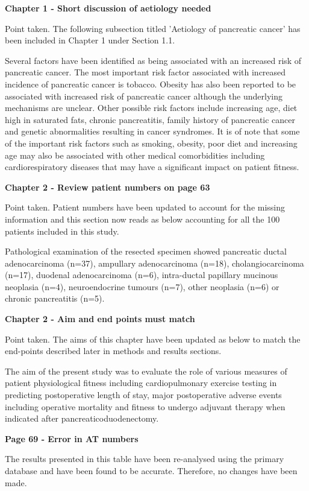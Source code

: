 \documentclass[12pt,a4paper]{article}
\begin{document}
	
\textbf{Chapter 1 - Short discussion of aetiology needed}
	
	Point taken. The following subsection titled 'Aetiology of pancreatic cancer' has been included in Chapter 1 under Section 1.1.
	
	Several factors have been identified as being associated with an increased risk of pancreatic cancer. 
	The most important risk factor associated with increased incidence of pancreatic cancer is tobacco. 
	Obesity has also been reported to be associated with increased risk of pancreatic cancer although the underlying mechanisms are unclear. 
	Other possible risk factors include increasing age, diet high in saturated fats, chronic pancreatitis, family history of pancreatic cancer and genetic abnormalities resulting in cancer syndromes. 
	It is of note that some of the important risk factors such as smoking, obesity, poor diet and increasing age may also be associated with other medical comorbidities including cardiorespiratory diseases that may have a significant impact on patient fitness.
	
\textbf{Chapter 2 - Review patient numbers on page 63}
	
	Point taken. Patient numbers have been updated to account for the missing information and this section now reads as below accounting for all the 100 patients included in this study.
	
	Pathological examination of the resected specimen showed pancreatic ductal adenocarcinoma (n=37), ampullary adenocarcinoma (n=18), cholangiocarcinoma (n=17), duodenal adenocarcinoma (n=6), intra-ductal papillary mucinous neoplasia (n=4), neuroendocrine tumours (n=7), other neoplasia (n=6) or chronic pancreatitis (n=5).
	
\textbf{Chapter 2 - Aim and end points must match }
	
	Point taken. The aims of this chapter have been updated as below to match the end-points described later in methods and results sections. 
	
	The aim of the present study was to evaluate the role of various measures of patient physiological fitness including cardiopulmonary exercise testing in predicting postoperative length of stay, major postoperative adverse events including operative mortality and fitness to undergo adjuvant therapy when indicated after pancreaticoduodenectomy.
	
\textbf{Page 69 - Error in AT numbers}
	
	The results presented in this table have been re-analysed using the primary database and have been found to be accurate. Therefore, no changes have been made.
	
\end{document}

